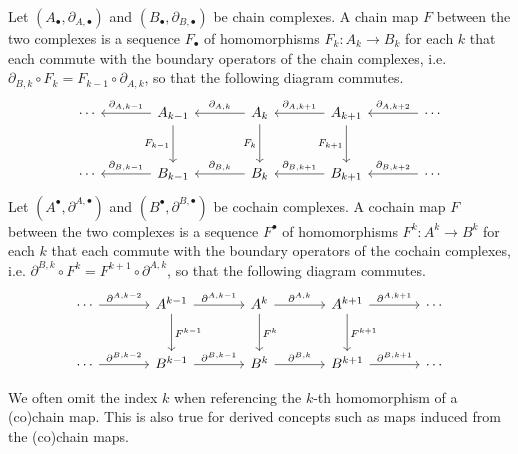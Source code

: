\documentclass[a4paper,12pt]{article}
\begin{document}
\begin{definition}\label{def:(co)chain_map}
    Let $(A_\bullet, \partial_{A,\bullet})$ and $(B_\bullet, \partial_{B,\bullet})$ be chain complexes.
    A chain map $F$ between the two complexes is a sequence $F_\bullet$ of homomorphisms $F_k \colon A_k \to B_k$ for each $k$ that each commute with the boundary operators of the chain complexes, i.e. $\partial_{B,k} \circ F_k = F_{k-1} \circ \partial_{A,k}$, so that the following diagram commutes.
    \[\begin{tikzcd}[sep=large]
	\cdots & {A_{k-1}} & {A_k} & {A_{k+1}} & \cdots \\
	\cdots & {B_{k-1}} & {B_k} & {B_{k+1}} & \cdots
	\arrow["{\partial_{A,k-1}}"', from=1-2, to=1-1]
	\arrow["{F_{k-1}}"', from=1-2, to=2-2]
	\arrow["{\partial_{A,k}}"', from=1-3, to=1-2]
	\arrow["{F_k}"', from=1-3, to=2-3]
	\arrow["{\partial_{A,k+1}}"', from=1-4, to=1-3]
	\arrow["{F_{k+1}}"', from=1-4, to=2-4]
	\arrow["{\partial_{A,k+2}}"', from=1-5, to=1-4]
	\arrow["{\partial_{B,k-1}}"', from=2-2, to=2-1]
	\arrow["{\partial_{B,k}}"', from=2-3, to=2-2]
	\arrow["{\partial_{B,k+1}}"', from=2-4, to=2-3]
	\arrow["{\partial_{B,k+2}}"', from=2-5, to=2-4]
    \end{tikzcd}\]
    Let $(A^\bullet, \partial^{A,\bullet})$ and $(B^\bullet, \partial^{B,\bullet})$ be cochain complexes.
    A cochain map $F$ between the two complexes is a sequence $F^\bullet$ of homomorphisms $F^k \colon A^k \to B^k$ for each $k$ that each commute with the boundary operators of the cochain complexes, i.e. $\partial^{B,k} \circ F^k = F^{k+1} \circ \partial^{A,k}$, so that the following diagram commutes.
    \[\begin{tikzcd}[sep=large]
	\cdots & {A^{k-1}} & {A^k} & {A^{k+1}} & \cdots \\
	\cdots & {B^{k-1}} & {B^k} & {B^{k+1}} & \cdots
	\arrow["{{\partial^{A,k-2}}}", from=1-1, to=1-2]
	\arrow["{{\partial^{A,k-1}}}", from=1-2, to=1-3]
	\arrow["{{F^{k-1}}}", from=1-2, to=2-2]
	\arrow["{{\partial^{A,k}}}", from=1-3, to=1-4]
	\arrow["{{F^k}}", from=1-3, to=2-3]
	\arrow["{{\partial^{A,k+1}}}", from=1-4, to=1-5]
	\arrow["{{F^{k+1}}}", from=1-4, to=2-4]
	\arrow["{{\partial^{B,k-2}}}", from=2-1, to=2-2]
	\arrow["{{\partial^{B,k-1}}}", from=2-2, to=2-3]
	\arrow["{{\partial^{B,k}}}", from=2-3, to=2-4]
	\arrow["{{\partial^{B,k+1}}}", from=2-4, to=2-5]
\end{tikzcd}\]
\end{definition}
\begin{remark}
    We often omit the index $k$ when referencing the $k$-th homomorphism of a (co)chain map.
    This is also true for derived concepts such as maps induced from the (co)chain maps.
\end{remark}
\end{document}
